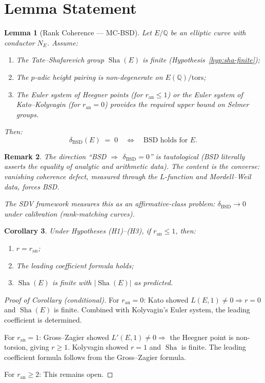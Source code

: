 \documentclass[11pt]{article}
\newtheorem{lemma}{Lemma}
\newtheorem{corollary}[lemma]{Corollary}
\newtheorem{remark}[lemma]{Remark}
\theoremstyle{definition}
\DeclareMathOperator{\Sha}{Sha}
\begin{document}
\section{Lemma Statement}

\begin{lemma}[Rank Coherence --- MC-BSD]
\label{lem:MC-BSD}
Let $E/\mathbb{Q}$ be an elliptic curve with conductor $N_E$.  Assume:
\begin{enumerate}
  \item[(H1)] The Tate--Shafarevich group $\Sha(E)$ is finite
    (Hypothesis~\ref{hyp:sha-finite});
  \item[(H2)] The $p$-adic height pairing is non-degenerate on $E(\mathbb{Q}) / \mathrm{tors}$;
  \item[(H3)] The Euler system of Heegner points (for $r_{\mathrm{an}} \leq 1$)
    or the Euler system of Kato--Kolyvagin (for $r_{\mathrm{an}} = 0$)
    provides the required upper bound on Selmer groups.
\end{enumerate}
Then:
\[
  \delta_{\mathrm{BSD}}(E) \;=\; 0
  \quad \Longleftrightarrow \quad
  \text{BSD holds for } E.
\]
\end{lemma}

\begin{remark}
The direction ``BSD $\Rightarrow$ $\delta_{\mathrm{BSD}} = 0$'' is tautological
(BSD literally asserts the equality of analytic and arithmetic data).
The content is the converse: vanishing coherence defect, measured through
the $L$-function and Mordell--Weil data, forces BSD.

The SDV framework measures this as an \emph{affirmative-class} problem:
$\delta_{\mathrm{BSD}} \to 0$ under calibration (rank-matching curves).
\end{remark}

\begin{corollary}
\label{cor:bsd}
Under Hypotheses (H1)--(H3), if $r_{\mathrm{an}} \leq 1$, then:
\begin{enumerate}
  \item $r = r_{\mathrm{an}}$;
  \item The leading coefficient formula holds;
  \item $\Sha(E)$ is finite with $|\Sha(E)|$ as predicted.
\end{enumerate}
\end{corollary}

\begin{proof}[Proof of Corollary (conditional)]
For $r_{\mathrm{an}} = 0$: Kato \cite{Kato} showed $L(E,1) \neq 0 \Rightarrow r = 0$
and $\Sha(E)$ is finite.  Combined with Kolyvagin's Euler system,
the leading coefficient is determined.

For $r_{\mathrm{an}} = 1$: Gross--Zagier \cite{GZ} showed $L'(E,1) \neq 0 \Rightarrow$
the Heegner point is non-torsion, giving $r \geq 1$.
Kolyvagin \cite{Koly} showed $r = 1$ and $\Sha$ is finite.
The leading coefficient formula follows from the Gross--Zagier formula.

For $r_{\mathrm{an}} \geq 2$: This remains open.
\end{proof}
\end{document}
